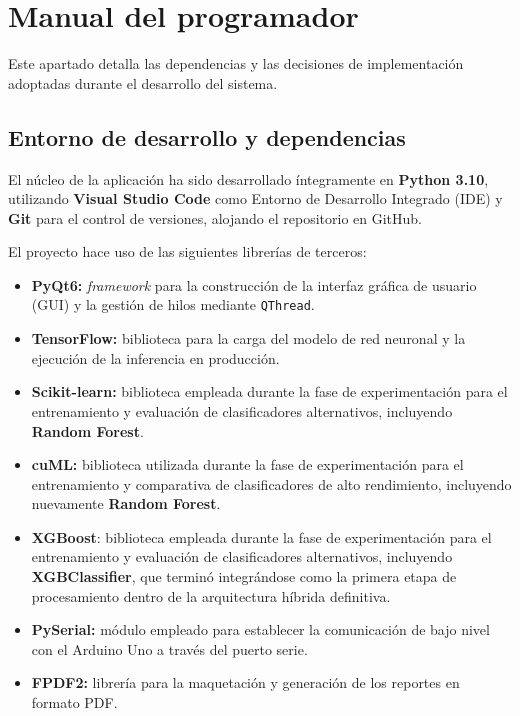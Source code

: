\section{Manual del programador}

Este apartado detalla las dependencias y las decisiones de implementación
adoptadas durante el desarrollo del sistema.

\subsection*{Entorno de desarrollo y dependencias}

El núcleo de la aplicación ha sido desarrollado íntegramente en
\textbf{Python 3.10}, utilizando \textbf{Visual Studio Code} como Entorno de
Desarrollo Integrado (IDE) y \textbf{Git} para el control de versiones,
alojando el repositorio en GitHub.

El proyecto hace uso de las siguientes librerías de terceros:

\begin{itemize}
    \item \textbf{PyQt6:} \textit{framework} para la construcción de la
    interfaz gráfica de usuario (GUI) y la gestión de hilos mediante
    \texttt{QThread}.
    \item \textbf{TensorFlow:} biblioteca para la carga del modelo de red
    neuronal y la ejecución de la inferencia en producción.
    \item \textbf{Scikit-learn:} biblioteca empleada durante la fase de
    experimentación para el entrenamiento y evaluación de clasificadores
    alternativos, incluyendo \textbf{Random Forest}.
    \item \textbf{cuML:} biblioteca utilizada durante la fase de
    experimentación para el entrenamiento y comparativa de clasificadores
    de alto rendimiento, incluyendo nuevamente \textbf{Random Forest}.
    \item \textbf{XGBoost}: biblioteca empleada durante la fase de experimentación
    para el entrenamiento y evaluación de clasificadores alternativos, incluyendo \textbf{XGBClassifier},
    que terminó integrándose como la primera etapa de procesamiento dentro de la arquitectura híbrida definitiva.
    \item \textbf{PySerial:} módulo empleado para establecer la comunicación
    de bajo nivel con el Arduino Uno a través del puerto serie.
    \item \textbf{FPDF2:} librería para la maquetación y generación de los
    reportes en formato PDF.
\end{itemize}

